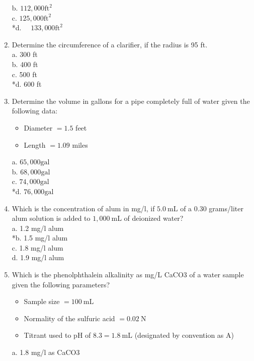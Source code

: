 \begin{enumerate}
b. $112,000 \mathrm{ft}^{2}$\\
c. $125,000 \mathrm{ft}^{2}$\\
*d. $\quad 133,000 \mathrm{ft}^{2}$\\
  \item Determine the circumference of a clarifier, if the radius is 95 ft.\\
a. 300 ft\\
b. 400 ft\\
c. 500 ft\\
*d. 600 ft\\
  \item Determine the volume in gallons for a pipe completely full of water given the following data:\\
\begin{itemize}
  \item Diameter $=1.5$ feet\\
  \item Length $=1.09$ miles\\
\end{itemize}
a. $65,000 \mathrm{gal}$\\
b. $68,000 \mathrm{gal}$\\
c. $74,000 \mathrm{gal}$\\
*d. $76,000 \mathrm{gal}$ \\
\item Which is the concentration of alum in mg/l, if $5.0 \mathrm{~mL}$ of a 0.30 grams/liter alum solution is added to $1,000 \mathrm{~mL}$ of deionized water?\\
a. 1.2 mg/l alum\\
*b. 1.5 mg/l alum\\
c. 1.8 mg/l alum\\
d. 1.9 mg/l alum\\
\item Which is the phenolphthalein alkalinity as mg/L CaCO3 of a water sample given the following parameters?\\
\begin{itemize}
  \item Sample size $=100 \mathrm{~mL}$\\
  \item Normality of the sulfuric acid $=0.02 \mathrm{~N}$\\
  \item Titrant used to pH of $8.3=1.8 \mathrm{~mL}$ (designated by convention as A)\\
\end{itemize}
a. 1.8 mg/l as CaCO3\\

\end{enumerate}
